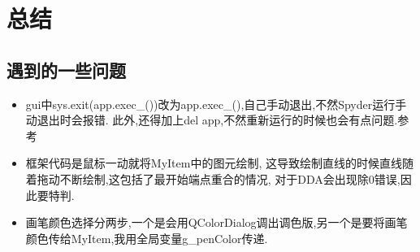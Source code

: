 \documentclass[a4paper,UTF8]{article}
\theoremstyle{definition}
\begin{document}
\section{总结}
\subsection{遇到的一些问题}
\begin{itemize}
	\item gui中sys.exit(app.exec\_())改为app.exec\_(),自己手动退出,不然Spyder运行手动退出时会报错.
	此外,还得加上del app,不然重新运行的时候也会有点问题.参考\cite{exit}
	
	\item 框架代码是鼠标一动就将MyItem中的图元绘制,
	这导致绘制直线的时候直线随着拖动不断绘制,这包括了最开始端点重合的情况,
	对于DDA会出现除0错误,因此要特判.
	
	\item 画笔颜色选择分两步,一个是会用QColorDialog调出调色版,另一个是要将画笔颜色传给MyItem,我用全局变量g\_penColor传递.
\end{itemize}

%

\end{document}
